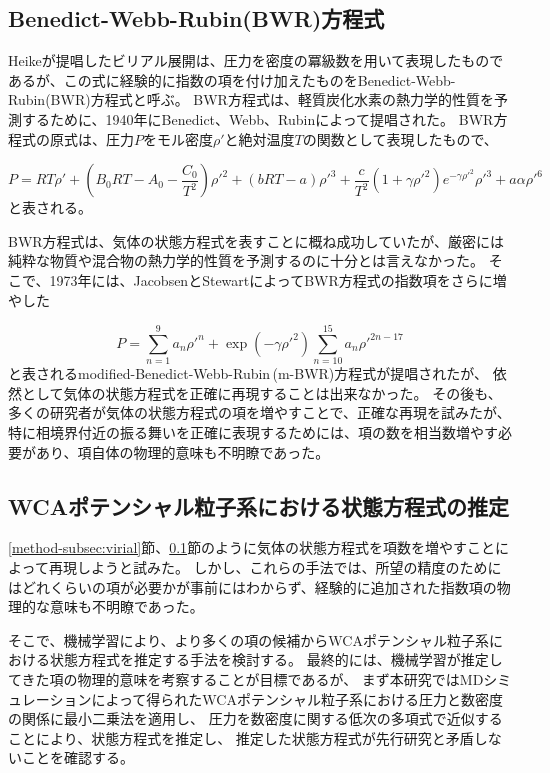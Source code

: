 \documentclass[titlepage]{jsreport}
\begin{document}
{{{\newpage
\subsection{Benedict-Webb-Rubin(BWR)方程式}\label{method-subsec:BWR}
Heikeが提唱したビリアル展開は、圧力を密度の冪級数を用いて表現したものであるが、この式に経験的に指数の項を付け加えたものをBenedict-Webb-Rubin(BWR)方程式と呼ぶ。
BWR方程式は、軽質炭化水素の熱力学的性質を予測するために、1940年にBenedict、Webb、Rubinによって提唱された\cite{BWR-equation:original}。
BWR方程式の原式は、圧力$P$をモル密度${\rho}'$と絶対温度$T$の関数として表現したもので、

\large
\begin{equation}
P=RT{\rho}'+\left(B_0RT-A_0-{\frac{C_0}{T^2}}\right){{\rho}'}^2+(bRT-a){{\rho}'}^3+{\frac{c}{T^2}}(1+{\gamma}{{\rho}'}^2)e^{-{\gamma}{{\rho}'}^2}{{\rho}'}^3+a{\alpha}{{\rho}'}^6\label{eq:BWR}
\end{equation}
\normalsize
と表される。

BWR方程式は、気体の状態方程式を表すことに概ね成功していたが、厳密には純粋な物質や混合物の熱力学的性質を予測するのに十分とは言えなかった。
そこで、1973年には、JacobsenとStewartによってBWR方程式の指数項をさらに増やした

\large
\begin{equation}
P=\sum_{n=1}^9a_n{{\rho}'}^n+\exp(-{\gamma}{{\rho}'}^2)\sum_{n=10}^{15}a_n{{\rho}'}^{2n-17}\label{eq:m-BWR}
\end{equation}
\normalsize
と表されるmodified-Benedict-Webb-Rubin\,(m-BWR)方程式が提唱\cite{m-BWR-equation}されたが、
依然として気体の状態方程式を正確に再現することは出来なかった。
その後も、多くの研究者が気体の状態方程式の項を増やすことで、正確な再現を試みた\cite{MCCARTY1974276,BWR-equation:13,BWR-equation:25}が、
特に相境界付近の振る舞いを正確に表現するためには、項の数を相当数増やす必要があり、項自体の物理的意味も不明瞭であった。


\subsection{WCAポテンシャル粒子系における状態方程式の推定}\label{method-subsec:WCA-equation}
\ref{method-subsec:virial}節、\ref{method-subsec:BWR}節のように気体の状態方程式を項数を増やすことによって再現しようと試みた。
しかし、これらの手法では、所望の精度のためにはどれくらいの項が必要かが事前にはわからず、経験的に追加された指数項の物理的な意味も不明瞭であった。

そこで、機械学習により、より多くの項の候補からWCAポテンシャル粒子系における状態方程式を推定する手法を検討する。
最終的には、機械学習が推定してきた項の物理的意味を考察することが目標であるが、
まず本研究ではMDシミュレーションによって得られたWCAポテンシャル粒子系における圧力と数密度の関係に最小二乗法を適用し、
圧力を数密度に関する低次の多項式で近似することにより、状態方程式を推定し、
推定した状態方程式が先行研究と矛盾しないことを確認する。

}}}
\end{document}
